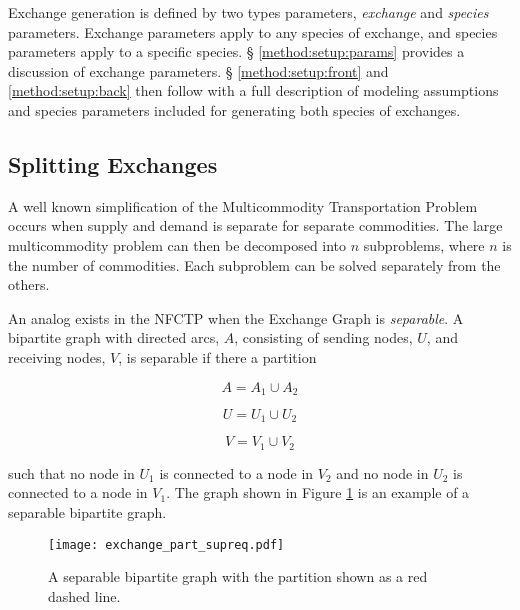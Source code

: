 Exchange generation is defined by two types parameters, \textit{exchange} and
\textit{species} parameters. Exchange parameters apply to any species of
exchange, and species parameters apply to a specific species. \S
\ref{method:setup:params} provides a discussion of exchange parameters. \S
\ref{method:setup:front} and \ref{method:setup:back} then follow with a full
description of modeling assumptions and species parameters included for
generating both species of exchanges.

\subsection{Splitting Exchanges}\label{method:setup:split}

A well known simplification of the Multicommodity Transportation Problem occurs
when supply and demand is separate for separate commodities. The large
multicommodity problem can then be decomposed into $n$ subproblems, where $n$ is
the number of commodities. Each subproblem can be solved separately from the
others.

An analog exists in the NFCTP when the Exchange Graph is \textit{separable}. A
bipartite graph with directed arcs, $A$, consisting of sending nodes, $U$, and
receiving nodes, $V$, is separable if there a partition

\begin{equation}
  A = A_{1} \cup A_{2}
\end{equation}

\begin{equation}
  U = U_{1} \cup U_{2}
\end{equation}

\begin{equation}
  V = V_{1} \cup V_{2}
\end{equation}

such that no node in $U_1$ is connected to a node in $V_2$ and no node in $U_2$
is connected to a node in $V_1$. The graph shown in Figure \ref{fig:basic_part} is an
example of a separable bipartite graph.

\begin{figure}
  \begin{center}
    \texttt{[image: exchange\_part\_supreq.pdf]}
    \caption[]{
      \label{fig:basic_part}
      A separable bipartite graph with the partition shown as a red 
      dashed line.}
  \end{center}
\end{figure}

